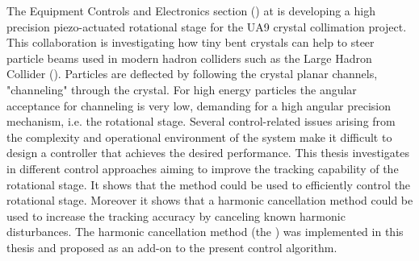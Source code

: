The Equipment Controls and Electronics section (\abbrENSTIECE) at \abbrCERN is developing a high precision piezo-actuated rotational stage for the UA9 crystal collimation project. This collaboration is investigating how tiny bent crystals can help to steer particle beams used in modern hadron colliders such as the Large Hadron Collider (\abbrLHC). Particles are deflected by following the crystal planar channels, "channeling" through the crystal. For high energy particles the angular acceptance for channeling is very low, demanding for a high angular precision mechanism, i.e. the rotational stage. Several control-related issues arising from the complexity and operational environment of the system make it difficult to design a controller that achieves the desired performance. This thesis investigates in different control approaches aiming to improve the tracking capability of the rotational stage. It shows that the \abbrIRC method could be used to efficiently control the rotational stage. Moreover it shows that a harmonic cancellation method could be used to increase the tracking accuracy by canceling known harmonic disturbances. The harmonic cancellation method (the \abbrRFDC) was implemented in this thesis and proposed as an add-on to the present control algorithm.
